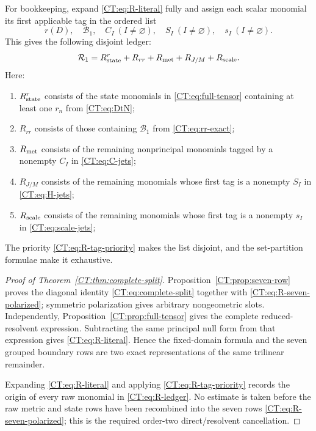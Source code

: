 \begin{theorem}
For bookkeeping, expand \eqref{CT:eq:R-literal} fully and assign each scalar
monomial its first applicable tag in the ordered list
\begin{equation}\label{CT:eq:R-tag-priority}
 r(D),\quad \mathcal B_1,\quad C_I\ (I\ne\varnothing),\quad
 S_I\ (I\ne\varnothing),\quad s_I\ (I\ne\varnothing).
\end{equation}
This gives the following disjoint ledger:
\begin{equation}\label{CT:eq:R-ledger}
 \mathcal R_1=R_{\rm state}^{r}+R_{rr}+R_{\rm met}
       +R_{J/M}+R_{\rm scale}.
\end{equation}
Here:
\begin{enumerate}
\item $R_{\rm state}^{r}$ consists of the state monomials in
\eqref{CT:eq:full-tensor} containing at least one $r_n$ from
\eqref{CT:eq:DtN};
\item $R_{rr}$ consists of those containing $\mathcal B_1$ from
\eqref{CT:eq:rr-exact};
\item $R_{\rm met}$ consists of the remaining nonprincipal monomials
tagged by a nonempty $C_I$ in \eqref{CT:eq:C-jets};
\item $R_{J/M}$ consists of the remaining monomials whose first tag is a
nonempty $S_I$ in \eqref{CT:eq:H-jets};
\item $R_{\rm scale}$ consists of the remaining monomials whose first tag
is a nonempty $s_I$ in \eqref{CT:eq:scale-jets};
\end{enumerate}
The priority \eqref{CT:eq:R-tag-priority} makes the list disjoint, and the
set-partition formulae make it exhaustive.
\end{theorem}

\begin{proof}[Proof of Theorem~\ref{CT:thm:complete-split}]
Proposition~\ref{CT:prop:seven-row} proves the diagonal identity
\eqref{CT:eq:complete-split} together with
\eqref{CT:eq:R-seven-polarized}; symmetric polarization gives arbitrary
nongeometric slots.  Independently, Proposition~\ref{CT:prop:full-tensor}
gives the complete reduced-resolvent expression.  Subtracting the same
principal null form from that expression gives \eqref{CT:eq:R-literal}.
Hence the fixed-domain formula and the seven grouped boundary rows are two
exact representations of the same trilinear remainder.

Expanding \eqref{CT:eq:R-literal} and applying
\eqref{CT:eq:R-tag-priority} records the origin of every raw monomial in
\eqref{CT:eq:R-ledger}.  No estimate is taken before the raw metric and state
rows have been recombined into the seven rows
\eqref{CT:eq:R-seven-polarized}; this is the required order-two
direct/resolvent cancellation.
\end{proof}

